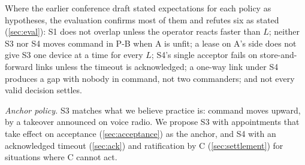 Where the earlier conference draft stated expectations for each policy as hypotheses, the
evaluation confirms most of them and refutes six as stated (\cref{sec:eval}): S1 does not
overlap unless the operator reacts faster than $L$; neither S3 nor S4 moves command in P-B
when A is unfit; a lease on A's side does not give S3 one device at a time for every $L$;
S4's single acceptor fails on store-and-forward links unless the timeout is acknowledged;
a one-way link under S4 produces a gap with nobody in command, not two commanders; and not
every valid decision settles. 

\textit{Anchor policy.} S3 matches what we believe practice is: command moves upward, by a
takeover announced on voice radio. We propose S3 with appointments that take effect on
acceptance (\cref{sec:acceptance}) as the anchor, and S4 with an acknowledged timeout
(\cref{sec:ack}) and ratification by C (\cref{sec:settlement}) for situations where C
cannot act. 
